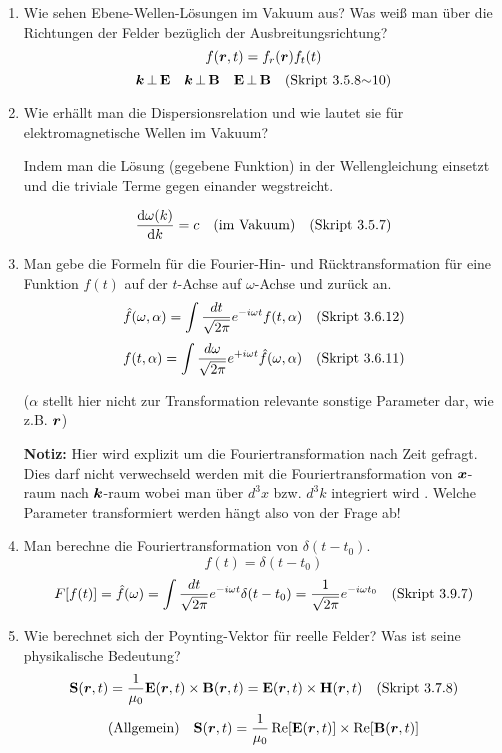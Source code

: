 \begin{enumerate}
  \item Wie sehen Ebene-Wellen-Lösungen im Vakuum aus? Was weiß man
        über die Richtungen der Felder bezüglich der 
        Ausbreitungsrichtung?
        $$f(\vb* r , t)=f_r(\vb* r)f_t(t)$$
        $$\vb* k \,\bot\, \vb E \quad \vb* k\,\bot\,\vb B \quad
        \vb E\,\bot\, \vb B\quad\text{(Skript 3.5.8$\sim$10)}$$

  \item Wie erhällt man die Dispersionsrelation und wie lautet sie für
        elektromagnetische Wellen im Vakuum?
        \begin{center}
          Indem man die Lösung (gegebene Funktion) in 
          der Wellengleichung einsetzt und die
          triviale Terme gegen einander wegstreicht.
        \end{center}
        $$\dv{\omega(k)}{k}=c \quad\text{(im Vakuum)}\quad\text{(Skript 3.5.7)}$$

  \item Man gebe die Formeln für die Fourier-Hin- und Rücktransformation
        für eine Funktion $f(t)$ auf der $t$-Achse auf $\omega$-Achse und
        zurück an.
        $$\hat f(\omega, \alpha)=\int \frac{dt}{\sqrt{2\pi}}
              e^{-i\omega t}f(t, \alpha)\quad\text{(Skript 3.6.12)}$$
        $$f(t, \alpha)=\int \frac{d\omega}{\sqrt{2\pi}}
                         e^{+i\omega t}\hat f(\omega, \alpha)
                        \quad\text{(Skript 3.6.11)}$$
        \begin{center}
          ($\alpha$ stellt hier nicht zur Transformation relevante 
          sonstige Parameter dar, wie z.B. $\vb* r$)
        \end{center}
        \textbf{Notiz:} Hier wird explizit um die Fouriertransformation 
        nach Zeit gefragt. Dies darf nicht verwechseld werden mit die 
        Fouriertransformation von $\vb* x$-raum nach $\vb* k$-raum 
        wobei man über
        $d^3x$ bzw. $d^3k$ integriert wird .
        Welche Parameter transformiert werden hängt also von der Frage 
        ab!

  \item Man berechne die Fouriertransformation von $\delta(t-t_0)$.
        $$f(t)=\delta (t-t_0)$$ 
        $$F[f(t)]=\hat f(\omega)
        =\int\frac{dt}{\sqrt{2\pi}}e^{-i\omega t}\delta(t-t_0)
        =\frac{1}{\sqrt{2\pi}}e^{-i\omega t_0}
        \quad\text{(Skript 3.9.7)}$$ 

  \item Wie berechnet sich der Poynting-Vektor für reelle Felder? Was
        ist seine physikalische Bedeutung?
        $$\vb S(\vb* r,t)=\frac{1}{\mu_0}\vb E(\vb* r,t)\times\vb B(\vb* r,t)
        =\vb E(\vb* r,t)\times \vb H(\vb* r,t)
        \quad\text{(Skript 3.7.8)}$$
        $$\text{(Allgemein)}\quad\vb S(\vb* r,t)=
        \frac{1}{\mu_0}\Re[\vb E(\vb* r,t)]\times \Re[\vb B(\vb* r,t)]$$
        

\end{enumerate}
